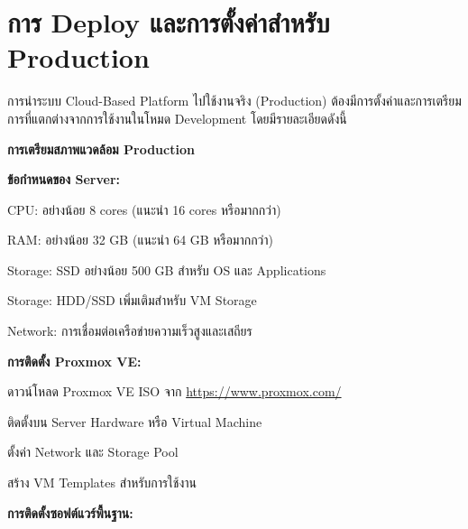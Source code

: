 \section{การ Deploy และการตั้งค่าสำหรับ Production}
\hspace*{1.5em}
การนำระบบ Cloud-Based Platform ไปใช้งานจริง (Production) ต้องมีการตั้งค่าและการเตรียมการที่แตกต่างจากการใช้งานในโหมด Development โดยมีรายละเอียดดังนี้

\vspace{0.5em}
\textbf{การเตรียมสภาพแวดล้อม Production}
\vspace{0.5em}

\begin{mycustomenum2}
    \item \textbf{ข้อกำหนดของ Server:}
    \begin{mycustomenum2}
        \item CPU: อย่างน้อย 8 cores (แนะนำ 16 cores หรือมากกว่า)
        \item RAM: อย่างน้อย 32 GB (แนะนำ 64 GB หรือมากกว่า)
        \item Storage: SSD อย่างน้อย 500 GB สำหรับ OS และ Applications
        \item Storage: HDD/SSD เพิ่มเติมสำหรับ VM Storage
        \item Network: การเชื่อมต่อเครือข่ายความเร็วสูงและเสถียร
    \end{mycustomenum2}

    \item \textbf{การติดตั้ง Proxmox VE:}
    \begin{mycustomenum2}
        \item ดาวน์โหลด Proxmox VE ISO จาก \url{https://www.proxmox.com/}
        \item ติดตั้งบน Server Hardware หรือ Virtual Machine
        \item ตั้งค่า Network และ Storage Pool
        \item สร้าง VM Templates สำหรับการใช้งาน
    \end{mycustomenum2}

    \item \textbf{การติดตั้งซอฟต์แวร์พื้นฐาน:}


\end{mycustomenum2}
